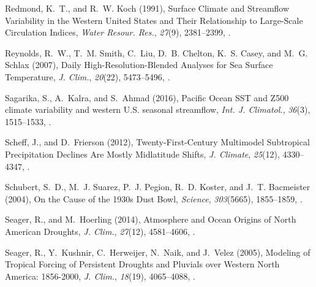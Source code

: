 \documentclass[final, double]{ua-thesis}
\begin{document}
\begin{thebibliography}{59}
Redmond, K.~T., and R.~W. Koch (1991), Surface {Climate} and {Streamflow}
  {Variability} in the {Western} {United} {States} and {Their} {Relationship}
  to {Large}-{Scale} {Circulation} {Indices}, \textit{Water Resour. Res.},
  \textit{27}(9), 2381--2399, .

Reynolds, R.~W., T.~M. Smith, C.~Liu, D.~B. Chelton, K.~S. Casey, and M.~G.
  Schlax (2007), Daily {High}-{Resolution}-{Blended} {Analyses} for {Sea}
  {Surface} {Temperature}, \textit{J. Clim.}, \textit{20}(22), 5473--5496,
  .

Sagarika, S., A.~Kalra, and S.~Ahmad (2016), Pacific {Ocean} {SST} and {Z}500
  climate variability and western {U}.{S}. seasonal streamflow, \textit{Int. J.
  Climatol.}, \textit{36}(3), 1515--1533, .

Scheff, J., and D.~Frierson (2012), Twenty-{First}-{Century} {Multimodel}
  {Subtropical} {Precipitation} {Declines} {Are} {Mostly} {Midlatitude}
  {Shifts}, \textit{J. Climate}, \textit{25}(12), 4330--4347,
  .


Schubert, S.~D., M.~J. Suarez, P.~J. Pegion, R.~D. Koster, and J.~T. Bacmeister
  (2004), On the {Cause} of the 1930s {Dust} {Bowl}, \textit{Science},
  \textit{303}(5665), 1855--1859, .

Seager, R., and M.~Hoerling (2014), Atmosphere and {Ocean} {Origins} of {North}
  {American} {Droughts}, \textit{J. Clim.}, \textit{27}(12), 4581--4606,
  .

Seager, R., Y.~Kushnir, C.~Herweijer, N.~Naik, and J.~Velez (2005), Modeling of
  {Tropical} {Forcing} of {Persistent} {Droughts} and {Pluvials} over {Western}
  {North} {America}: 1856-2000, \textit{J. Clim.}, \textit{18}(19),
  4065--4088, .


\end{thebibliography}
\end{document}
